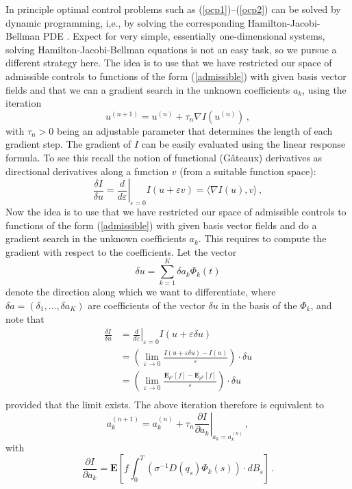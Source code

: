 \documentclass[]{tMPH2e}
\newcommand{\eps}{\varepsilon}
\newcommand{\bE}{{\mathbf E}}
\newcommand{\wrt}{with respect to }
\begin{document}
In principle optimal control problems such as (\ref{ocp1})--(\ref{ocp2}) can be solved by dynamic programming, i,e., by solving the corresponding Hamilton-Jacobi-Bellman PDE \cite{fleming2006}. Expect for very simple, essentially one-dimensional systems, solving Hamilton-Jacobi-Bellman equations is not an easy task, so we pursue a different strategy here. The idea is to use that we have restricted our space of admissible controls to functions of the form (\ref{admissible}) with given basis vector fields and that we can a gradient search in the unknown coefficients $a_{k}$, using the iteration
\[
u^{(n+1)} = u^{(n)} + \tau_{n}\nabla I(u^{(n)})\,,
\]
with $\tau_{n}>0$ being an adjustable parameter that determines the length of each gradient step. The gradient of $I$ can be easily evaluated using the linear response formula. To see this recall the notion of functional (G\^ateaux) derivatives as directional derivatives along a function $v$ (from a suitable function space): 
\begin{equation*}
\frac{\delta I}{\delta u} = \left.\frac{d}{d\eps}\right|_{\eps=0} I(u+\eps v) = \langle\nabla I(u),v\rangle\,,
\end{equation*} 
Now the idea is to use that we have restricted our space of admissible controls to functions of the form (\ref{admissible}) with given basis vector fields and do a gradient search in the unknown coefficients $a_{k}$. This requires to compute the gradient \wrt the coefficients. Let the vector  
\[
\delta u = \sum_{k=1}^K \delta a_k \Phi_k(t)
\]   
denote the direction along which we want to differentiate, where $\delta a=(\delta_{1},\ldots,\delta a_{K})$ are coefficients of the vector $\delta u$ in the basis of the $\Phi_{k}$, and note that 
\begin{equation*}
\begin{aligned}
\frac{\delta I}{\delta u} & = \left.\frac{d}{d\eps}\right|_{\eps=0} I(u+\eps \delta u)\\
& = \left(\lim_{\eps\to 0}\frac{I(u+\eps\delta u) - I(u)}{\eps}\right)\cdot \delta u\\
& = \left(\lim_{\eps\to 0}\frac{\bE_{\rho^{\eps}}[f] - \bE_{\rho^{0}}[f]}{\eps}\right)\cdot\delta u\\
\end{aligned}
\end{equation*} 
provided that the limit exists. The above iteration therefore is equivalent to
\[
a_{k}^{(n+1)} = a_{k}^{(n)} + \tau_{n}\left.\frac{\partial I}{\partial a_{k}}\right|_{a_{k}=a_{k}^{(n)}}\,,
\]
with
\[
\frac{\partial I}{\partial a_{k}} = \bE\left[f\int_{0}^{T}(\sigma^{-1}D(q_{s})\Phi_{k}(s))\cdot dB_{s} \right]\,.
\]
\end{document}
